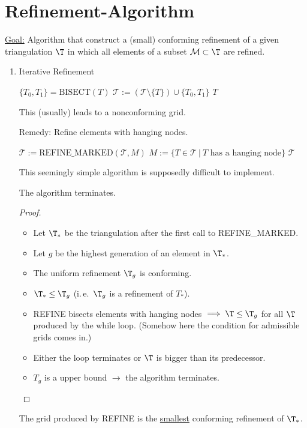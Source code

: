\section{Refinement-Algorithm}
\underline{Goal:} Algorithm that construct a (small) conforming refinement of a given triangulation $\T$ in which all elements of a subset $\mathcal{M} \subset \T$ are refined.
\begin{enumerate}[label = \alph*)]
	\item Iterative Refinement
    \begin{algorithmic}[0]
        \State $\{T_0, T_1\} = \text{BISECT} (T)$
          \State $\mathcal{T} := (\mathcal{T} \setminus \{T\}) \cup \{T_0, T_1\}$
        \EndFor
        \State \Return $T$
      \EndFunction
    \end{algorithmic}
    This (usually) leads to a nonconforming grid.

		Remedy: Refine elements with hanging nodes.
    \begin{algorithmic}[0]
          \State $\mathcal{T} := \text{REFINE\_MARKED}(\mathcal{T}, M)$
          \State $M := \{T \in \mathcal{T} \ |\ T \text{ has a hanging node}\}$
        \EndWhile
        \State \Return $\mathcal{T}$
      \EndFunction
    \end{algorithmic}
    This seemingly simple algorithm is supposedly difficult to implement.
		\begin{lemma}
			The algorithm terminates.
    \end{lemma}
    \begin{proof}
			\begin{itemize}
				\item Let $\T_{*}$ be the triangulation after the first call to REFINE\_MARKED.
				\item Let $g$ be the highest generation of an element in $\T_{*}$. 
				\item The uniform refinement $\T_{g}$ is conforming.
				\item $\T_{*}\leq \T_{g}$ (i.\,e.\ $\T_{g}$ is a refinement of $T_{*}$).
        \item REFINE bisects elements with hanging nodes $\implies \T \leq \T_{g}$ for all $\T$ produced by the \glqq while\grqq{} loop. (Somehow here the condition for admissible grids comes in.)
				\item Either the loop terminates or $\T$ is bigger than its predecessor.
				\item $T_{g}$ is a upper bound $\to$ the algorithm terminates.
			\end{itemize}
		\end{proof}
		\begin{lemma}
			The grid produced by REFINE
			is the \underline{smallest} conforming refinement of $\T_{*}$.
		\end{lemma}

\end{enumerate}
